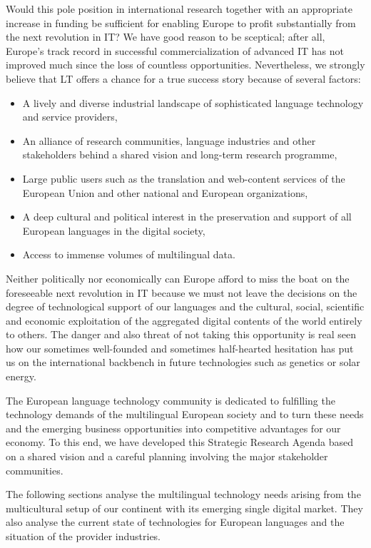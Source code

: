 \documentclass[10pt, plain]{../../metanetpaper}
\begin{document}
\begin{multicols}{2}
Would this pole position in international research together with an appropriate increase in funding be sufficient for enabling Europe to profit substantially from the next revolution in IT? We have good reason to be sceptical; after all, Europe’s track record in successful commercialization of advanced IT has not improved much since the loss of countless opportunities. Nevertheless, we strongly believe that LT offers a chance for a true success story because of several factors:

\begin{itemize}
\item A lively and diverse industrial landscape of sophisticated language technology and service providers,
\item An alliance of research communities, language industries and other stakeholders behind a shared vision and long-term research programme,
\item Large public users such as the translation and web-content services of the European Union and other national and European organizations,
\item A deep cultural and political interest in the preservation and support of all European languages in the digital society,
\item Access to immense volumes of multilingual data.
\end{itemize}

Neither politically nor economically can Europe afford to miss the boat on the foreseeable next revolution in IT because we must not leave the decisions on the degree of technological support of our languages and the cultural, social, scientific and economic exploitation of the aggregated digital contents of the world entirely to others. The danger and also threat of not taking this opportunity is real seen how our sometimes well-founded and sometimes half-hearted hesitation has put us on the international backbench in future technologies such as genetics or solar energy.

The European language technology community is dedicated to fulfilling the technology demands of the multilingual European society and to turn these needs and the emerging business opportunities into competitive advantages for our economy. To this end, we have developed this Strategic Research Agenda based on a shared vision and a careful planning involving the major stakeholder communities.

The following sections analyse the multilingual technology needs arising from the multicultural setup of our continent with its emerging single digital market. They also analyse the current state of technologies for European languages and the situation of the provider industries. 


\end{multicols}
\end{document}
